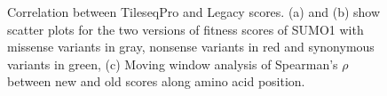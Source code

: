\documentclass{article}
\begin{document}
\begin{figure}[H]%
    \centering
    \qquad
    \qquad
    \caption{Correlation between TileseqPro and Legacy scores. (a) and (b) show scatter plots for the two versions of fitness scores of SUMO1 with missense variants in gray, nonsense variants in red and synonymous variants in green, (c) Moving window analysis of Spearman's $\rho$ between new and old scores along amino acid position.}%
    \label{fig:scatter plot}%
\end{figure}
\end{document}
